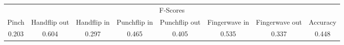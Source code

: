 \documentclass{standalone}
\begin{document}
 
 \begin{tabular}{|c|c|c|c|c|c|c ||c|}
\cline{1-8}\multicolumn{8}{|c|}{F-Scores} \\ 
\cline{1-8}Pinch & Handflip out & Handflip in & Punchflip in & Punchflip out & Fingerwave in & Fingerwave out & Accuracy\\ 
\cline{1-8}0.203 & 0.604 & 0.297 & 0.465 & 0.405 & 0.535 & 0.337 & 0.448\\ 
 \cline{1-8}\hline \end{tabular}
 
\end{document}
